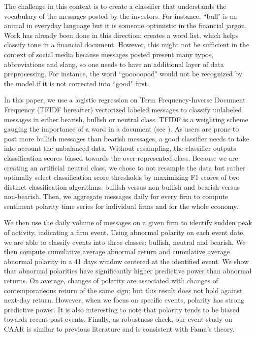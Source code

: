 The challenge in this context is to create a classifier that understands the vocabulary of the messages posted by the investors. For instance, ``bull" is an animal in everyday language but it is someone optimistic in the financial jargon. Work has already been done in this direction: \citet{loughran2011liability} creates a word list, which helps classify tone in a financial document. However, this might not be sufficient in the context of social media because messages posted present many typos, abbreviations and slang, so one needs to have an additional layer of data preprocessing. For instance, the word ``goooooood" would not be recognized by the model if it is not corrected into ``good" first. 

In this paper, we use a logistic regression on Term Frequency-Inverse Document Frequency (TFIDF hereafter) vectorized labeled messages to classify unlabeled messages in either bearish, bullish or neutral class. TFIDF is a weighting scheme gauging the importance of a word in a document (see \citet{erdemlioglu2017market}). As users are prone to post more bullish messages than bearish messages, a good classifier needs to take into account the unbalanced data. Without resampling, the classifier outputs classification scores biased towards the over-represented class. Because we are creating an artificial neutral class, we chose to not resample the data but rather optimally select classification score thresholds by maximizing F1 scores of two distinct classification algorithms: bullish versus non-bullish and bearish versus non-bearish. Then, we aggregate messages daily for every firm to compute sentiment polarity time series for individual firms and for the whole economy. 

We then use the daily volume of messages on a given firm to identify sudden peak of activity, indicating a firm event. Using abnormal polarity on each event date, we are able to classify events into three classes: bullish, neutral and bearish. We then compute cumulative average abnormal return and cumulative average abnormal polarity in a 41 days window centered at the identified event. We show that abnormal polarities have significantly higher predictive power than abnormal returns. On average, changes of polarity are associated with changes of contemporaneous return of the same sign; but this result does not hold against next-day return. However, when we focus on specific events, polarity has strong predictive power. It is also interesting to note that polarity tends to be biased towards recent past events. Finally, as robustness check, our event study on CAAR is similar to previous literature and is consistent with Fama’s theory.

